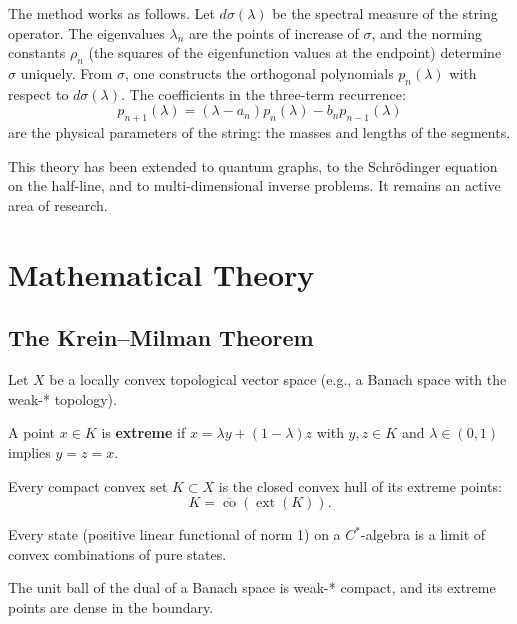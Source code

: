 The method works as follows. Let $d\sigma(\lambda)$ be the spectral measure of the string operator. The eigenvalues $\lambda_n$ are the points of increase of $\sigma$, and the norming constants $\rho_n$ (the squares of the eigenfunction values at the endpoint) determine $\sigma$ uniquely. From $\sigma$, one constructs the orthogonal polynomials $p_n(\lambda)$ with respect to $d\sigma(\lambda)$. The coefficients in the three-term recurrence:
\[
p_{n+1}(\lambda) = (\lambda - a_n) p_n(\lambda) - b_n p_{n-1}(\lambda)
\]
are the physical parameters of the string: the masses and lengths of the segments.

This theory has been extended to quantum graphs, to the Schr\"{o}dinger equation on the half-line, and to multi-dimensional inverse problems. It remains an active area of research.

\section{Mathematical Theory}

\subsection{The Krein--Milman Theorem}

Let $X$ be a locally convex topological vector space (e.g., a Banach space with the weak-* topology).

\begin{definition}
A point $x \in K$ is \textbf{extreme} if $x = \lambda y + (1-\lambda)z$ with $y,z \in K$ and $\lambda \in (0,1)$ implies $y = z = x$.
\end{definition}

\begin{theorem}
Every compact convex set $K \subset X$ is the closed convex hull of its extreme points:
\[
K = \overline{\operatorname{co}}(\operatorname{ext}(K)).
\]
\end{theorem}

\begin{corollary}
Every state (positive linear functional of norm 1) on a $C^*$-algebra is a limit of convex combinations of pure states.
\end{corollary}

\begin{corollary}
The unit ball of the dual of a Banach space is weak-* compact, and its extreme points are dense in the boundary.
\end{corollary}

